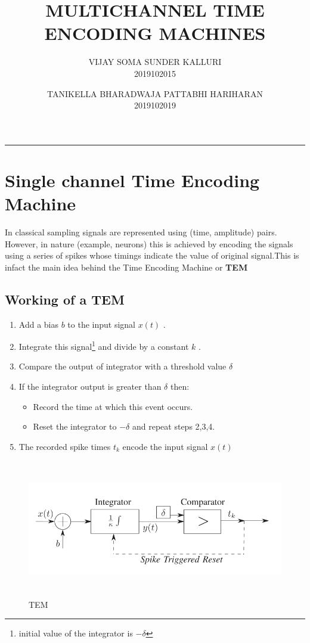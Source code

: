 \documentclass{article}
\title{\textbf{MULTICHANNEL TIME ENCODING MACHINES}}
\author{
    VIJAY SOMA SUNDER KALLURI \\
    2019102015
    \and
    TANIKELLA BHARADWAJA PATTABHI HARIHARAN \\
    2019102019
}
\begin{document}
\maketitle
\smallskip\hrule\bigskip
\bigskip

\section{Single channel Time Encoding Machine}
In classical sampling signals are represented using (time, amplitude) pairs. However, in
nature (example, neurons) this is achieved by encoding the signals using a series of spikes
whose timings indicate the value of original signal.This is infact the main idea behind the Time Encoding Machine or \textbf{TEM} 

\subsection{Working of a TEM}
\begin{enumerate}
    \item Add a bias $b$ to the input signal $x(t)$ .
    \item Integrate this signal\footnote{initial value of the integrator is $-\delta$} and divide by a constant $k$ .
    \item Compare the output of integrator with a threshold value $\delta$
    \item If the integrator output is greater than $\delta$ then:
    \begin{itemize}
        \item Record the time at which this event occurs.
        \item Reset the integrator to $-\delta$ and repeat steps 2,3,4. 
    \end{itemize}
    \item The recorded spike times $t_k$ encode the input signal $x(t)$
\end{enumerate}
\begin{figure}
    \centering
    \includegraphics[width = 14cm , height = 6cm]{1.jpg}
    \caption{TEM}
    \label{fig:my_label}
\end{figure}
\end{document}
